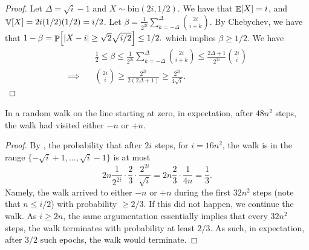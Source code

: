 \begin{proof}
    Let $\Delta = \sqrt{i}-1$ and $X \sim \mathrm{bin}(2i,1/2)$. We
    have that $\mathop{\mathbb{E}}\!\left[ {X} \right] = i$, and $\mathop{\mathbb{V}}\!\left[ {X} \right] = 2i (1/2)(1/2) = i/2$.  Let
    \begin{math}
        \beta = \frac{1}{2^{2i}} \sum_{k=-\Delta}^\Delta
        \binom{2i}{i+k}.
    \end{math}
    By Chebychev, we have that
    \begin{math}
        1 - \beta =%
        \Prob{|X - i| \geq \sqrt{2} \sqrt{i/2}} \leq 1/2.
    \end{math}
    which implies
    \begin{math}
        \beta \geq 1/2.
    \end{math}
    We have
    \begin{align*}
        &\frac{1}{2} \leq \beta \leq
        \frac{1}{2^{2i}}
        \sum_{k=-\Delta}^\Delta \binom{2i}{i+k}%
        \leq%
        \frac{2\Delta+1}{2^{2i}} \binom{2i}{i}
        \\
        \implies\quad&
        \binom{2i}{i}
        \geq%
        \frac{2^{2i}}{2(2\Delta+1)}
        \geq%
        \frac{2^{2i}}{4\sqrt{i}}.
    \end{align*}
\end{proof}

\begin{lemma}
    In a random walk on the line starting at zero, in expectation,
    after $48n^2$ steps, the walk had visited either $-n$ or $+n$.
\end{lemma}
\begin{proof}
    By , the probability that after $2i$
    steps, for $i=16n^2$, the walk is in the range
    $\{-\sqrt{i}+1, \ldots, \sqrt{i}-1 \}$ is at most
    \begin{equation*}
        2n \frac{1}{2^{2i}} \cdot \frac{2}{3} \cdot \frac{2^{2i}}{\sqrt{i}}
        = %
        2n  \frac{2}{3} \cdot \frac{1}{4n}
        = %
        \frac{1}{3}.
    \end{equation*}
    Namely, the walk arrived to either $-n$ or $+n$ during the first
    $32n^2$ steps (note that $n \leq i/2$) with probability
    $\geq 2/3$.  If this did not happen, we continue the walk. As
    $ i\geq 2n$, the same argumentation essentially implies that every
    $32n^2$ steps, the walk terminates with probability at least
    $2/3$. As such, in expectation, after $3/2$ such epochs, the walk
    would terminate.
\end{proof}



